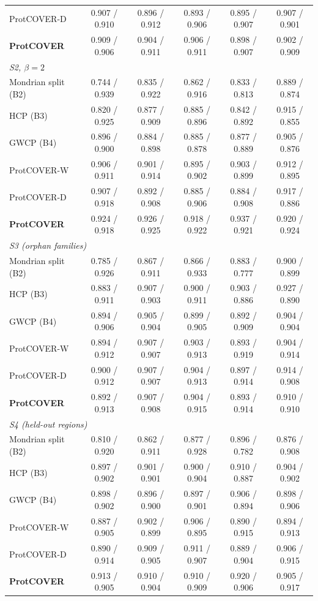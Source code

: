 \begin{tabular}{lccccc}
ProtCOVER-D & 0.907 / 0.910 & 0.896 / 0.912 & 0.893 / 0.906 & 0.895 / 0.907 & 0.907 / 0.901 \\
\textbf{ProtCOVER} & 0.909 / 0.906 & 0.904 / 0.911 & 0.906 / 0.911 & 0.898 / 0.907 & 0.902 / 0.909 \\
\midrule
\multicolumn{6}{l}{\emph{S2, $\beta=2$}} \\
Mondrian split (B2) & 0.744 / 0.939 & 0.835 / 0.922 & 0.862 / 0.916 & 0.833 / 0.813 & 0.889 / 0.874 \\
HCP (B3) & 0.820 / 0.925 & 0.877 / 0.909 & 0.885 / 0.896 & 0.842 / 0.892 & 0.915 / 0.855 \\
GWCP (B4) & 0.896 / 0.900 & 0.884 / 0.898 & 0.885 / 0.878 & 0.877 / 0.889 & 0.905 / 0.876 \\
ProtCOVER-W & 0.906 / 0.911 & 0.901 / 0.914 & 0.895 / 0.902 & 0.903 / 0.899 & 0.912 / 0.895 \\
ProtCOVER-D & 0.907 / 0.918 & 0.892 / 0.908 & 0.885 / 0.906 & 0.884 / 0.908 & 0.917 / 0.886 \\
\textbf{ProtCOVER} & 0.924 / 0.918 & 0.926 / 0.925 & 0.918 / 0.922 & 0.937 / 0.921 & 0.920 / 0.924 \\
\midrule
\multicolumn{6}{l}{\emph{S3 (orphan families)}} \\
Mondrian split (B2) & 0.785 / 0.926 & 0.867 / 0.911 & 0.866 / 0.933 & 0.883 / 0.777 & 0.900 / 0.899 \\
HCP (B3) & 0.883 / 0.911 & 0.907 / 0.903 & 0.900 / 0.911 & 0.903 / 0.886 & 0.927 / 0.890 \\
GWCP (B4) & 0.894 / 0.906 & 0.905 / 0.904 & 0.899 / 0.905 & 0.892 / 0.909 & 0.904 / 0.904 \\
ProtCOVER-W & 0.894 / 0.912 & 0.907 / 0.907 & 0.903 / 0.913 & 0.893 / 0.919 & 0.904 / 0.914 \\
ProtCOVER-D & 0.900 / 0.912 & 0.907 / 0.907 & 0.904 / 0.913 & 0.897 / 0.914 & 0.914 / 0.908 \\
\textbf{ProtCOVER} & 0.892 / 0.913 & 0.907 / 0.908 & 0.904 / 0.915 & 0.893 / 0.914 & 0.910 / 0.910 \\
\midrule
\multicolumn{6}{l}{\emph{S4 (held-out regions)}} \\
Mondrian split (B2) & 0.810 / 0.920 & 0.862 / 0.911 & 0.877 / 0.928 & 0.896 / 0.782 & 0.876 / 0.908 \\
HCP (B3) & 0.897 / 0.902 & 0.901 / 0.901 & 0.900 / 0.904 & 0.910 / 0.887 & 0.904 / 0.902 \\
GWCP (B4) & 0.898 / 0.902 & 0.896 / 0.900 & 0.897 / 0.901 & 0.906 / 0.894 & 0.898 / 0.906 \\
ProtCOVER-W & 0.887 / 0.905 & 0.902 / 0.899 & 0.906 / 0.895 & 0.890 / 0.915 & 0.894 / 0.913 \\
ProtCOVER-D & 0.890 / 0.914 & 0.909 / 0.905 & 0.911 / 0.907 & 0.889 / 0.904 & 0.906 / 0.915 \\
\textbf{ProtCOVER} & 0.913 / 0.905 & 0.910 / 0.904 & 0.910 / 0.909 & 0.920 / 0.906 & 0.905 / 0.917 \\
\bottomrule
\end{tabular}
